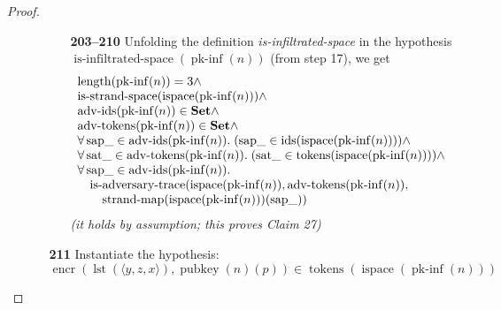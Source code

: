 \documentclass[11pt]{article}
\theoremstyle{plain}
\begin{document}
\begin{proof}
\begin{itemize}[leftmargin=2.8em, itemsep=4pt, parsep=1pt]
\begin{itemize}[leftmargin=2.8em, itemsep=4pt, parsep=1pt]
  \begin{itemize}[leftmargin=2.8em, itemsep=4pt, parsep=1pt]
  \item[\textbf{203--210}] Unfolding the definition \emph{is-infiltrated-space} in the hypothesis $\operatorname{is\text{-}infiltrated\text{-}space}(\operatorname{pk\text{-}inf}(n))$ (from step 17), we get
\begin{equation*}
\begin{array}{@{}l@{}} \operatorname{length}(\operatorname{pk\text{-}inf}(n)) = 3 \wedge \\ \operatorname{is\text{-}strand\text{-}space}(\operatorname{ispace}(\operatorname{pk\text{-}inf}(n))) \wedge \\ \operatorname{adv\text{-}ids}(\operatorname{pk\text{-}inf}(n)) \in \mathbf{Set} \wedge \\ \operatorname{adv\text{-}tokens}(\operatorname{pk\text{-}inf}(n)) \in \mathbf{Set} \wedge \\ \forall \operatorname{sap\_} \in \operatorname{adv\text{-}ids}(\operatorname{pk\text{-}inf}(n)).\; (\operatorname{sap\_} \in \operatorname{ids}(\operatorname{ispace}(\operatorname{pk\text{-}inf}(n)))) \wedge \\ \forall \operatorname{sat\_} \in \operatorname{adv\text{-}tokens}(\operatorname{pk\text{-}inf}(n)).\; (\operatorname{sat\_} \in \operatorname{tokens}(\operatorname{ispace}(\operatorname{pk\text{-}inf}(n)))) \wedge \\ \forall \operatorname{sap\_} \in \operatorname{adv\text{-}ids}(\operatorname{pk\text{-}inf}(n)). \\ \quad \operatorname{is\text{-}adversary\text{-}trace}(\operatorname{ispace}(\operatorname{pk\text{-}inf}(n)), \operatorname{adv\text{-}tokens}(\operatorname{pk\text{-}inf}(n)), \\ \quad \quad \operatorname{strand\text{-}map}(\operatorname{ispace}(\operatorname{pk\text{-}inf}(n)))(\operatorname{sap\_})) \end{array}
\end{equation*}
  \emph{(it holds by assumption; this proves Claim 27)}
  \end{itemize}
  \item[\textbf{211}] Instantiate the hypothesis:
\begin{equation*}
\operatorname{encr}(\operatorname{lst}(\langle y, z, x \rangle), \operatorname{pubkey}(n)(p)) \in \operatorname{tokens}(\operatorname{ispace}(\operatorname{pk\text{-}inf}(n)))
\end{equation*}


\end{itemize}
\end{itemize}
\end{proof}
\end{document}
